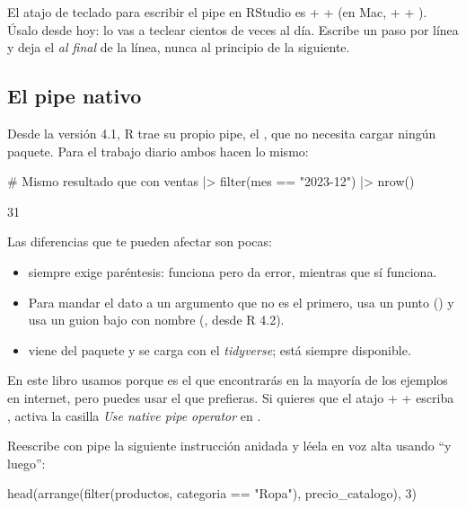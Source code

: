 \begin{consejo}
El atajo de teclado para escribir el pipe en RStudio es
 +  +  (en Mac,  +
 + ). Úsalo desde hoy: lo vas a teclear cientos de
veces al día. Escribe un paso por línea y deja el \codigo{\%>\%} \emph{al
final} de la línea, nunca al principio de la siguiente.
\end{consejo}

\subsection{El pipe nativo \texorpdfstring{\codigo{|>}}{|>}}

Desde la versión 4.1, R trae su propio pipe, el 
\codigo{|>}, que no necesita cargar ningún paquete. Para el trabajo diario
ambos hacen lo mismo:

\begin{rcode}
# Mismo resultado que con %
ventas |>
  filter(mes == "2023-12") |>
  nrow()
\end{rcode}
\begin{rsalida}
[1] 31
\end{rsalida}

Las diferencias que te pueden afectar son pocas:

\begin{itemize}
  \item \codigo{|>} siempre exige paréntesis: 
        funciona pero  da error, mientras que
         sí funciona.
  \item Para mandar el dato a un argumento que no es el primero,
        \codigo{\%>\%} usa un punto () y \codigo{|>} usa un
        guion bajo con nombre (, desde R 4.2).
  \item \codigo{\%>\%} viene del paquete  y se carga con
        el \emph{tidyverse}; \codigo{|>} está siempre disponible.
\end{itemize}

En este libro usamos \codigo{\%>\%} porque es el que encontrarás en la
mayoría de los ejemplos en internet, pero puedes usar el que prefieras. Si
quieres que el atajo  +  +  escriba
\codigo{|>}, activa la casilla \emph{Use native pipe operator} en
.

\begin{hazlotu}
Reescribe con pipe la siguiente instrucción anidada y léela en voz alta
usando ``y luego'':
\begin{rnoejecutar}
head(arrange(filter(productos, categoria == "Ropa"), precio_catalogo), 3)
\end{rnoejecutar}
\end{hazlotu}

